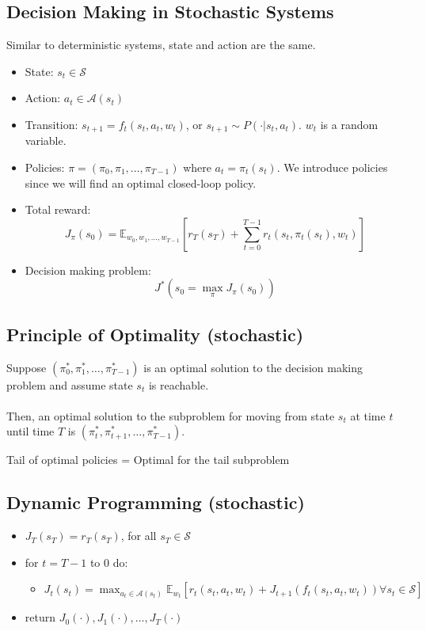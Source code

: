 \documentclass[10pt]{article}
\begin{document}
\subsection*{Decision Making in Stochastic Systems}
Similar to deterministic systems, state and action are the same.
\begin{itemize}
	\item State: $s_t \in \mathcal{S}$
	\item Action: $a_t \in \mathcal{A}(s_t)$
	\item Transition: $s_{t + 1} = f_t(s_t, a_t, w_t)$, or $s_{t + 1} \sim P(\cdot \vert s_t, a_t)$.  $w_t$ is a random variable.
	\item Policies: $\pi = (\pi_0, \pi_1, \dots, \pi_{T - 1})$ where $a_t = \pi_t(s_t)$.  We introduce policies since we will find an optimal closed-loop policy.
	\item Total reward: 
    \[J_\pi (s_0) = \mathbb{E}_{w_0, w_1, \dots, w_{T - 1}} \left[r_T (s_T) + \sum_{t = 0}^{T - 1} r_t (s_t, \pi_t (s_t), w_t)\right]\]
    \item Decision making problem:
    \[J^*(s_0 = \max_\pi J_\pi (s_0))\]
\end{itemize}

\subsection*{Principle of Optimality (stochastic)}
Suppose $(\pi_0^*, \pi_1^*, \dots, \pi_{T - 1}^*)$ is an optimal solution to the decision making problem and assume state $s_t$ is reachable.\\\\
Then, an optimal solution to the subproblem for moving from state $s_t$ at time $t$ until time $T$ is $(\pi_t^*, \pi_{t + 1}^*, \dots, \pi_{T - 1}^*)$.
\begin{center}
    Tail of optimal policies = Optimal for the tail subproblem
\end{center}

\subsection*{Dynamic Programming (stochastic)}
\begin{itemize}
	\item $J_T (s_T) = r_T (s_T)$, for all $s_T \in \mathcal{S}$
	\item for $t = T - 1$ to $0$ do:
	\begin{itemize}
        \item $J_t (s_t) = \max_{a_t \in \mathcal{A}(s_t)} \mathbb{E}_{w_t} \left[r_t(s_t, a_t, w_t) + J_{t + 1}(f_t(s_t, a_t, w_t)) \forall s_t \in \mathcal{S}\right]$
    \end{itemize}
    \item return $J_0(\cdot), J_1(\cdot), \dots, J_T(\cdot)$
\end{itemize}
\end{document}
